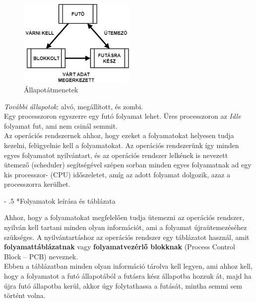 \documentclass[tikz,12pt,margin=0px]{article}
\makeatletter
\renewcommand\paragraph{%
	\@startsection{paragraph}{4}{0mm}%
	{-\baselineskip}%
	{.5\baselineskip}%
	{\normalfont\normalsize\bfseries}}
\makeatother
\begin{document}
	\begin{figure}[H]
		\centering
		\includegraphics[width=0.5\textwidth]{img/allapot.png}
		\caption{Állapotátmenetek}
        \label{allapotatmentek}
	\end{figure}

    \noindent \textit{További állapotok}: alvó, megállított, és zombi.\\

    \noindent Egy processzoron egyszerre egy futó folyamat lehet. Üres processzoron az \emph{Idle} folyamat fut, ami nem csinál semmit.\\
	
    \noindent Az operációs rendszernek ahhoz, hogy ezeket a folyamatokat helyesen tudja kezelni, felügyelnie kell a folyamatokat. Az operációs rendszerünk így minden egyes folyamatot nyilvántart, és az operációs rendszer lelkének is nevezett ütemező (scheduler) segítségével szépen sorban minden egyes folyamatnak ad egy kis processzor- (CPU) időszeletet, amíg az adott folyamat dolgozik, azaz a processzorra kerülhet.

    \paragraph*{Folyamatok leírása és táblázata}

    \noindent Ahhoz, hogy a folyamatokat megfelelően tudja ütemezni az operációs rendszer, nyilván kell tartani minden olyan információt, ami a folyamat újraütemezéséhez szükséges. A nyilvántartáshoz az operációs rendszer egy táblázatot használ, amit \textbf{folyamattáblázatnak} vagy \textbf{folyamatvezérlő blokknak} (Process Control Block – PCB) neveznek.\\

    \noindent Ebben a táblázatban minden olyan információ tárolva kell legyen, ami ahhoz kell, hogy a folyamatot a futó állapotából a futásra kész állapotba hozzuk át, majd ha újra futó állapotba kerül, akkor úgy folytathassa a futását, mintha semmi sem történt volna.\\
\end{document}
